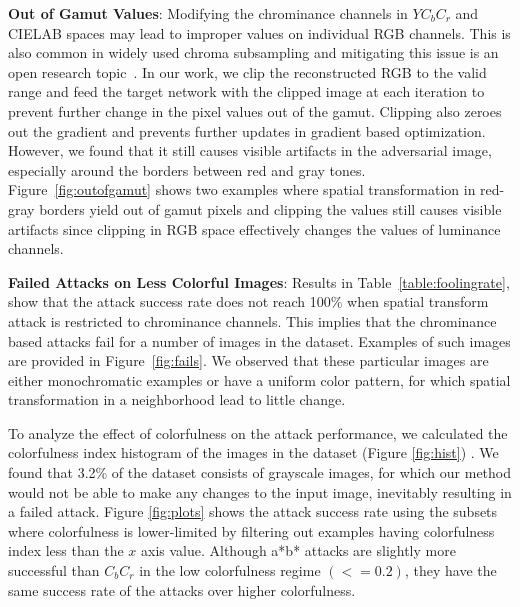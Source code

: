 \textbf{Out of Gamut Values}: Modifying the chrominance channels in \(YC_{b}C_{r}\) and CIELAB spaces may lead to improper values on individual RGB channels. This is also common in widely used chroma subsampling and mitigating this issue is an open research topic~\cite{chan2008toward}. In our work, we clip the reconstructed RGB to the valid range and feed the target network with the clipped image at each iteration to prevent further change in the pixel values out of the gamut. Clipping also zeroes out the gradient and prevents further updates in gradient based optimization. However, we found that it still causes visible artifacts in the adversarial image, especially around the borders between red and gray tones. Figure~\ref{fig:outofgamut} shows two examples where spatial transformation in red-gray borders yield out of gamut pixels and clipping the values still causes visible artifacts since clipping in RGB space effectively changes the values of luminance channels.

\textbf{Failed Attacks on Less Colorful Images}: Results in Table~\ref{table:foolingrate}, show that the attack success rate does not reach 100\% when spatial transform attack is restricted to chrominance channels.  %
This implies that the chrominance based attacks fail for a number of images in the dataset. Examples of such images are provided in Figure~\ref{fig:fails}. We observed that these  particular images are either monochromatic examples or have a uniform color pattern, for which spatial transformation in a neighborhood lead to little change.

To analyze the effect of colorfulness on the attack performance, we calculated the colorfulness index histogram of the images in the dataset (Figure \ref{fig:hist}) . We found that 3.2\% of the dataset consists of grayscale images, for which our method would not be able to make any changes to the input image, inevitably resulting in a failed attack. Figure \ref{fig:plots} shows the attack success rate using the subsets where colorfulness is lower-limited by filtering out examples having colorfulness index less than the \(x\) axis value. Although a*b* attacks are slightly more successful than \(C_bC_r\) in the low colorfulness regime \((<=0.2)\), they have the same success rate of the attacks over higher colorfulness.

